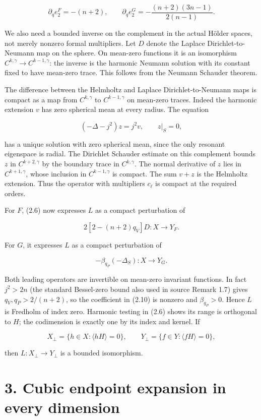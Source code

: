 \documentclass[11pt]{article}
\begin{document}
\[
\partial_q e^F_2=-(n+2),\qquad
\partial_q e^G_2=-\frac{(n+2)(3n-1)}{2(n-1)}.
\tag{2.8}
\]

We also need a bounded inverse on the complement in the actual Hölder
spaces, not merely nonzero formal multipliers. Let \(D\) denote the
Laplace Dirichlet-to-Neumann map on the sphere. On mean-zero functions
it is an isomorphism \(C^{k,\gamma}\to C^{k-1,\gamma}\): the inverse is
the harmonic Neumann solution with its constant fixed to have mean-zero
trace. This follows from the Neumann Schauder theorem.

The difference between the Helmholtz and Laplace Dirichlet-to-Neumann
maps is compact as a map from \(C^{k,\gamma}\) to \(C^{k-1,\gamma}\) on
mean-zero traces. Indeed the harmonic extension \(v\) has zero spherical
mean at every radius. The equation

\[
(-\Delta-j^2)z=j^2v,\qquad z|_S=0,
\tag{2.9}
\]

has a unique solution with zero spherical mean, since the only resonant
eigenspace is radial. The Dirichlet Schauder estimate on this complement
bounds \(z\) in \(C^{k+2,\gamma}\) by the boundary trace in
\(C^{k,\gamma}\). The normal derivative of \(z\) lies in
\(C^{k+1,\gamma}\), whose inclusion in \(C^{k-1,\gamma}\) is compact.
The sum \(v+z\) is the Helmholtz extension. Thus the operator with
multipliers \(c_\ell\) is compact at the required orders.

For \(F\), (2.6) now expresses \(L\) as a compact perturbation of

\[
2[2-(n+2)q_V]D:X\longrightarrow Y_F.
\tag{2.10}
\]

For \(G\), it expresses \(L\) as a compact perturbation of

\[
-\beta_{q_P}(-\Delta_S):X\longrightarrow Y_G.
\tag{2.11}
\]

Both leading operators are invertible on mean-zero invariant functions.
In fact \(j^2>2n\) (the standard Bessel-zero bound also used in source
Remark 1.7) gives \(q_V,q_P>2/(n+2)\), so the coefficient in (2.10) is
nonzero and \(\beta_{q_P}>0\). Hence \(L\) is Fredholm of index zero.
Harmonic testing in (2.6) shows its range is orthogonal to \(H\); the
codimension is exactly one by its index and kernel. If

\[
X_\perp=\{h\in X:\langle hH\rangle=0\},\qquad
Y_\perp=\{f\in Y:\langle fH\rangle=0\},
\tag{2.12}
\]

then \(L:X_\perp\to Y_\perp\) is a bounded isomorphism.

\section{3. Cubic endpoint expansion in every
dimension}\label{cubic-endpoint-expansion-in-every-dimension}
\end{document}
